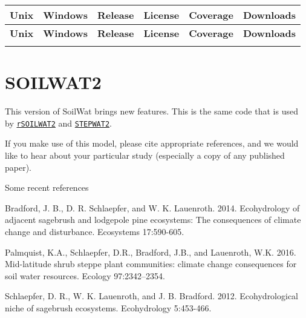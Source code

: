 \tabulinesep=1mm
\begin{longtabu} spread 0pt [c]{*{6}{|X[-1]}|}
\hline
\rowcolor{\tableheadbgcolor}\textbf{ Unix }&\textbf{ Windows }&\textbf{ Release }&\textbf{ License }&\textbf{ Coverage }&\textbf{ Downloads  }\\
\endfirsthead
\hline
\endfoot
\hline
\rowcolor{\tableheadbgcolor}\textbf{ Unix }&\textbf{ Windows }&\textbf{ Release }&\textbf{ License }&\textbf{ Coverage }&\textbf{ Downloads  }\\
\endhead
\href{https://travis-ci.org/Burke-Lauenroth-Lab/SOILWAT2}{\tt } &\href{https://ci.appveyor.com/project/dschlaep/soilwat2/branch/master}{\tt } &\href{https://github.com/Burke-Lauenroth-Lab/SOILWAT2/releases}{\tt } &\href{https://www.gnu.org/licenses/gpl.html}{\tt } &\href{https://codecov.io/gh/Burke-Lauenroth-Lab/SOILWAT2}{\tt } &\href{https://github.com/Burke-Lauenroth-Lab/SOILWAT2}{\tt } \\
\end{longtabu}


\section*{S\+O\+I\+L\+W\+A\+T2}

This version of Soil\+Wat brings new features. This is the same code that is used by \href{https://github.com/Burke-Lauenroth-Lab/rSOILWAT2}{\tt r\+S\+O\+I\+L\+W\+A\+T2} and \href{https://github.com/Burke-Lauenroth-Lab/STEPWAT2}{\tt S\+T\+E\+P\+W\+A\+T2}.

If you make use of this model, please cite appropriate references, and we would like to hear about your particular study (especially a copy of any published paper).

Some recent references


\begin{DoxyItemize}
\item Bradford, J. B., D. R. Schlaepfer, and W. K. Lauenroth. 2014. Ecohydrology of adjacent sagebrush and lodgepole pine ecosystems\+: The consequences of climate change and disturbance. Ecosystems 17\+:590-\/605.
\item Palmquist, K.\+A., Schlaepfer, D.\+R., Bradford, J.\+B., and Lauenroth, W.\+K. 2016. Mid-\/latitude shrub steppe plant communities\+: climate change consequences for soil water resources. Ecology 97\+:2342–2354.
\item Schlaepfer, D. R., W. K. Lauenroth, and J. B. Bradford. 2012. Ecohydrological niche of sagebrush ecosystems. Ecohydrology 5\+:453-\/466.
\end{DoxyItemize}

